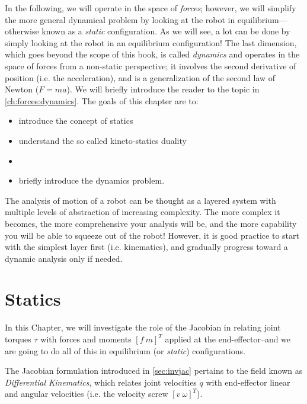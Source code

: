 In the following, we will operate in the space of \textsl{forces}; however, we will simplify the more general dynamical problem by looking at the robot in equilibrium---otherwise known as a \textsl{static} configuration.
As we will see, a lot can be done by simply looking at the robot in an equilibrium configuration!
The last dimension, which goes beyond the scope of this book, is called \textsl{dynamics} and operates in the space of forces from a non-static perspective; it involves the second derivative of position (i.e. the acceleration), and is a generalization of the second law of Newton ($F=ma$).
We will briefly introduce the reader to the topic in \cref{ch:forces:dynamics}.
%
The goals of this chapter are to:

\begin{itemize}
\item introduce the concept of statics
\item understand the so called kineto-statics duality
\item {}
\item briefly introduce the dynamics problem.
\end{itemize}


\begin{framed}
\noindent The analysis of motion of a robot can be thought as a layered system with multiple levels of abstraction of increasing complexity.
The more complex it becomes, the more comprehensive your analysis will be, and the more capability you will be able to squeeze out of the robot!
However, it is good practice to start with the simplest layer first (i.e. kinematics), and gradually progress toward a dynamic analysis only if needed.
\end{framed}

\section{Statics}

In this Chapter, we will investigate the role of the Jacobian in relating joint torques $\tau$ with forces and moments $[f \ m]^T$ applied at the end-effector--and we are going to do all of this in equilibrium (or \textsl{static}) configurations.


The Jacobian formulation introduced in \cref{sec:invjac} pertains to the field known as \emph{Differential Kinematics}, which relates joint velocities $\dot{q}$ with end-effector linear and angular velocities (i.e. the velocity screw $[v \ \omega]^T$).



